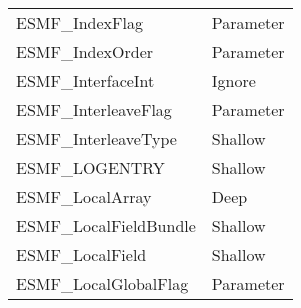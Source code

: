 \begin{table}[t]
\begin{tabular}{ll}
ESMF\_IndexFlag             & Parameter \\
ESMF\_IndexOrder            & Parameter \\
ESMF\_InterfaceInt          & Ignore\\
ESMF\_InterleaveFlag        & Parameter \\
ESMF\_InterleaveType        & Shallow\\
ESMF\_LOGENTRY              & Shallow\\
ESMF\_LocalArray            & Deep \\
ESMF\_LocalFieldBundle           & Shallow\\
ESMF\_LocalField            & Shallow\\
ESMF\_LocalGlobalFlag       & Parameter \\ 

\end{tabular}
\end{table}

